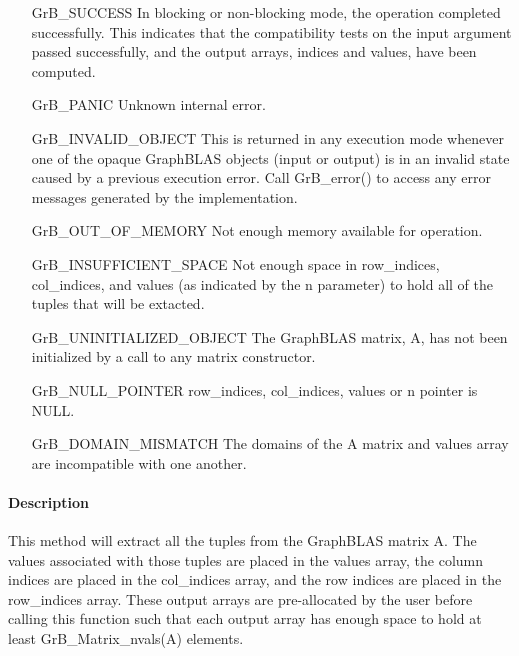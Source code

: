 \begin{itemize}[leftmargin=2.1in]
    \item[{\sf GrB\_SUCCESS}]  In blocking or non-blocking mode, the operation 
    completed successfully. This indicates that the compatibility tests on 
    the input argument passed successfully, and the output arrays, {\sf indices}
    and {\sf values}, have been computed.

    \item[{\sf GrB\_PANIC}]   Unknown internal error.
    
    \item[{\sf GrB\_INVALID\_OBJECT}] This is returned in any execution mode 
    whenever one of the opaque GraphBLAS objects (input or output) is in an invalid 
    state caused by a previous execution error.  Call {\sf GrB\_error()} to access 
    any error messages generated by the implementation.

    \item[{\sf GrB\_OUT\_OF\_MEMORY}]  Not enough memory available for operation.

    \item[{\sf GrB\_INSUFFICIENT\_SPACE}]  Not enough space in {\sf row\_indices}, 
    {\sf col\_indices}, and {\sf values} (as indicated by the {\sf n} parameter) 
    to hold all of the tuples that will be extacted.
    
    \item[{\sf GrB\_UNINITIALIZED\_OBJECT}]  The GraphBLAS matrix, {\sf A}, has 
    not been initialized by a call to any matrix constructor.
    
    \item[{\sf GrB\_NULL\_POINTER}]  {\sf row\_indices}, {\sf col\_indices}, 
    {\sf values} or {\sf n} pointer is {\sf NULL}.
    
    \item[\sf GrB\_DOMAIN\_MISMATCH] The domains of the {\sf A} matrix and 
    {\sf values} array are incompatible with one another.
\end{itemize}

\paragraph{Description}


This method will extract all the tuples from the GraphBLAS matrix {\sf A}.  
The values associated with those tuples are placed in the
{\sf values} array, the column indices are placed in the {\sf col\_indices} array, 
and the row indices are placed in the {\sf row\_indices} array. 
These output arrays are pre-allocated by the user before calling
this function such that each output array has enough
space to hold at least {\sf GrB\_Matrix\_nvals(A)} elements. 

